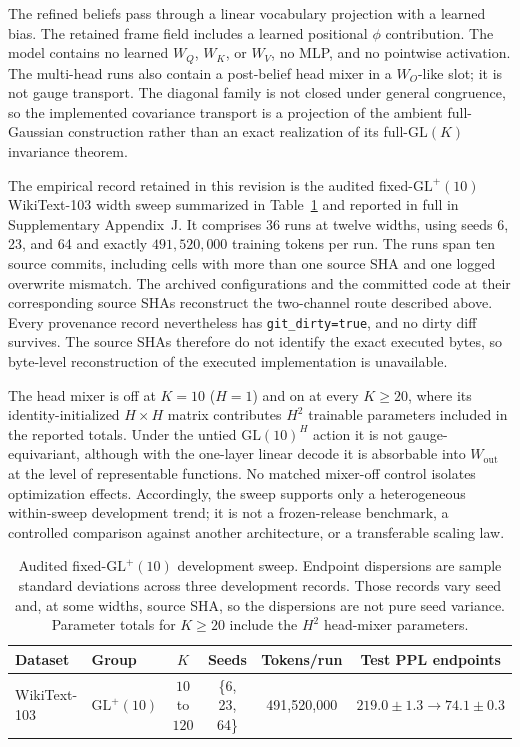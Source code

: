 \documentclass[twoside,11pt]{article}
\begin{document}
The refined beliefs pass through a linear vocabulary projection with a learned bias. The retained frame field includes a learned positional $\phi$ contribution. The model contains no learned $W_Q$, $W_K$, or $W_V$, no MLP, and no pointwise activation. The multi-head runs also contain a post-belief head mixer in a $W_O$-like slot; it is not gauge transport. The diagonal family is not closed under general congruence, so the implemented covariance transport is a projection of the ambient full-Gaussian construction rather than an exact realization of its full-$\mathrm{GL}(K)$ invariance theorem.

The empirical record retained in this revision is the audited fixed-$\mathrm{GL}^+(10)$ WikiText-103 width sweep summarized in Table~\ref{tab:glk_spec} and reported in full in Supplementary Appendix~J. It comprises 36 runs at twelve widths, using seeds 6, 23, and 64 and exactly $491{,}520{,}000$ training tokens per run. The runs span ten source commits, including cells with more than one source SHA and one logged overwrite mismatch. The archived configurations and the committed code at their corresponding source SHAs reconstruct the two-channel route described above. Every provenance record nevertheless has \texttt{git\_dirty=true}, and no dirty diff survives. The source SHAs therefore do not identify the exact executed bytes, so byte-level reconstruction of the executed implementation is unavailable.

The head mixer is off at $K=10$ ($H=1$) and on at every $K\geq20$, where its identity-initialized $H\times H$ matrix contributes $H^2$ trainable parameters included in the reported totals. Under the untied $\mathrm{GL}(10)^H$ action it is not gauge-equivariant, although with the one-layer linear decode it is absorbable into $W_{\mathrm{out}}$ at the level of representable functions. No matched mixer-off control isolates optimization effects. Accordingly, the sweep supports only a heterogeneous within-sweep development trend; it is not a frozen-release benchmark, a controlled comparison against another architecture, or a transferable scaling law.

\begin{table}[t]
\centering
\small
\renewcommand{\arraystretch}{1.2}
\begin{tabular}{llcccc}
\hline
\textbf{Dataset} & \textbf{Group} & $K$ & \textbf{Seeds} & \textbf{Tokens/run} & \textbf{Test PPL endpoints} \\
\hline
WikiText-103 & $\mathrm{GL}^+(10)$ & $10$ to $120$ & \{6, 23, 64\} & 491{,}520{,}000 & $219.0\pm1.3\to74.1\pm0.3$ \\
\hline
\end{tabular}
\caption{Audited fixed-$\mathrm{GL}^+(10)$ development sweep. Endpoint dispersions are sample standard deviations across three development records. Those records vary seed and, at some widths, source SHA, so the dispersions are not pure seed variance. Parameter totals for $K\geq20$ include the $H^2$ head-mixer parameters.}
\label{tab:glk_spec}
\end{table}
\end{document}
